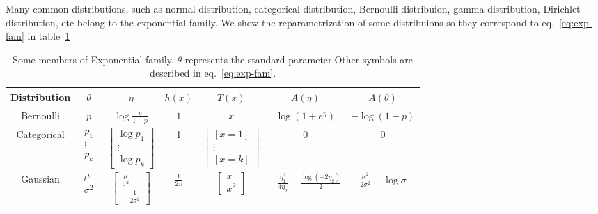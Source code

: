 Many common distributions, such as normal distribution, categorical distribution, 
Bernoulli distribuion, gamma distribution, Dirichlet distribution, etc belong to the exponential family. We show the reparametrization of some 
distribuions so they correspond to eq.~\ref{eq:exp-fam} in table~\ref{tab:exp-fam-reparametrization}
\begin{table}[ht]
    \centering
    \begin{tabular}{|c|c|c|c|c|c|c|}
      \hline
      Distribution & $\theta$ & $\eta$ & $h(x)$ & $T(x)$ & $A(\eta)$ & $A(\theta)$ \\
      \hline
      Bernoulli & $p$ & $\log \frac{p}{1-p}$ & $1$ & $x$ & $\log(1+e^{\eta})$ & $-\log(1-p)$\\
      \hline
      Categorical & $\begin{array}{c} p_1 \\ \vdots \\ p_k\end{array}$ & $\begin{bmatrix}\log p_1 \\ \vdots \\ \log p_k\end{bmatrix}$ & 1&  $\begin{bmatrix} [x=1] \\ \vdots \\ [x=k] \end{bmatrix}$ & 0& 0\\
      \hline
      Gaussian & $\begin{array}{c} \mu \\ \sigma^2 \end{array}$ & $\begin{bmatrix} \frac{\mu}{\sigma^2}\\ -\frac{1}{2\sigma^2} \end{bmatrix}$  & $\frac{1}{2\pi}$ & $\begin{bmatrix} x \\ x^2 \end{bmatrix} $  & $-\frac{\eta_1^2}{4\eta_2} - \frac{\log(-2\eta_2)}{2}$& $\frac{\mu^2}{2\sigma^2} + \log \sigma$\\
      \hline
    \end{tabular}
  \caption[Representatives of Exponential Family]{Some members of Exponential family. $\theta$ represents the standard parameter.Other symbols are described in eq.~\ref{eq:exp-fam}.}
  \label{tab:exp-fam-reparametrization}
  \end{table}
  
